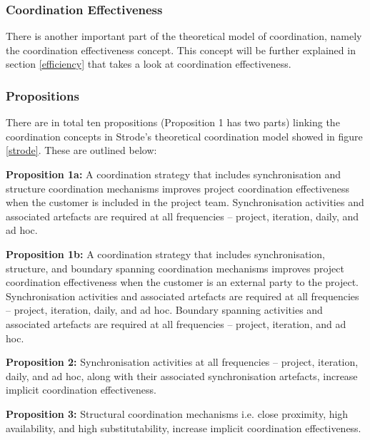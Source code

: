 \subsubsection{Coordination Effectiveness}

There is another important part of the theoretical model of coordination, namely the coordination effectiveness concept. This concept will be further explained in section \ref{efficiency} that takes a look at coordination effectiveness.

\subsubsection{Propositions}

There are in total ten propositions (Proposition 1 has two parts) linking the coordination concepts in Strode's theoretical coordination model showed in figure \ref{strode}. These are outlined below:

\begin{fancyquotes}
\textbf{Proposition 1a:} A coordination strategy that includes synchronisation and structure coordination mechanisms improves project coordination effectiveness when the customer is included in the project team. Synchronisation activities and associated artefacts are required at all frequencies – project, iteration, daily, and ad hoc.
\end{fancyquotes}

\begin{fancyquotes}
\textbf{Proposition 1b:} A coordination strategy that includes synchronisation, structure, and boundary spanning coordination mechanisms improves project coordination effectiveness when the customer is an external party to the project. Synchronisation activities and associated artefacts are required at all frequencies – project, iteration, daily, and ad hoc. Boundary spanning activities and associated artefacts are required at all frequencies – project, iteration, and ad hoc.
\end{fancyquotes}

\begin{fancyquotes}
\textbf{Proposition 2:} Synchronisation activities at all frequencies – project, iteration, daily, and ad hoc, along with their associated synchronisation artefacts, increase implicit coordination effectiveness.
\end{fancyquotes}

\begin{fancyquotes}
\textbf{Proposition 3:} Structural coordination mechanisms i.e. close proximity, high availability, and high substitutability, increase implicit coordination effectiveness.
\end{fancyquotes}

